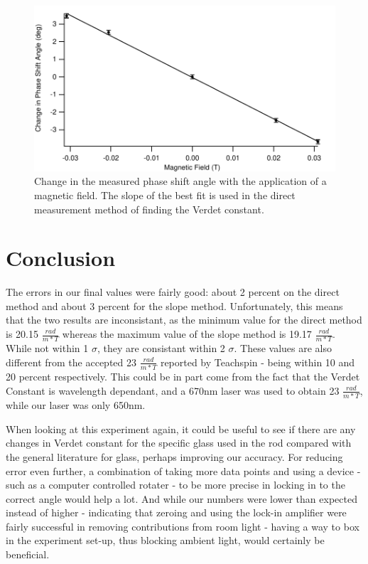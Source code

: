 \documentclass[prb,preprint]{revtex4-1}
\begin{document}
\begin{figure}[h]
\includegraphics[width=180mm]{dTheta_dT.pdf}
\caption{\label{dTheta_dT}Change in the measured phase shift angle with the application of a magnetic field. The slope of the best fit is used in the direct measurement method of finding the Verdet constant.}

\end{figure}

\section{Conclusion}
The errors in our final values were fairly good: about 2 percent on the direct method and about 3 percent for the slope method. Unfortunately, this means that the two results are inconsistant, as the minimum value for the direct method is 20.15 $\frac{rad}{m*T}$ whereas the maximum value of the slope method is 19.17 $\frac{rad}{m*T}$. While not within 1 $\sigma$, they are consistant within 2 $\sigma$. These values are also different from the accepted 23 $\frac{rad}{m*T}$ reported by Teachspin - being within 10 and 20 percent respectively. This could be in part come from the fact that the Verdet Constant is wavelength dependant, and a 670nm laser was used to obtain 23 $\frac{rad}{m*T}$, while our laser was only 650nm.

When looking at this experiment again, it could be useful to see if there are any changes in Verdet constant for the specific glass used in the rod compared with the general literature for glass, perhaps improving our accuracy. For reducing error even further, a combination of taking more data points and using a device - such as a computer controlled rotater - to be more precise in locking in to the correct angle would help a lot. And while our numbers were lower than expected instead of higher - indicating that zeroing and using the lock-in amplifier were fairly successful in removing contributions from room light - having a way to box in the experiment set-up, thus blocking ambient light, would certainly be beneficial.
\end{document}
